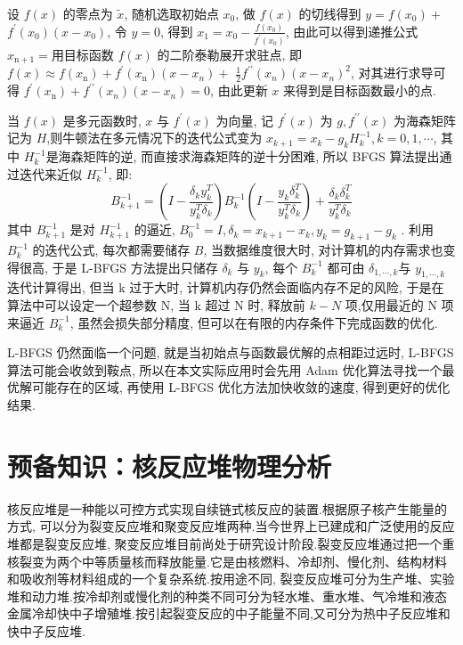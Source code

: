 \documentclass{Sichuan Normal University}
\begin{document}
设 $f(x)$ 的零点为 $\tilde{x}$, 随机选取初始点 $x_0$, 做 $f(x)$ 的切线得到 $y=f\left(x_0\right)+$ $f^{\prime}\left(x_0\right)\left(x-x_0\right)$, 令 $y=0$, 得到 $x_1=x_0-\frac{f\left(x_0\right)}{f^{\prime}\left(x_0\right)}$, 
由此可以得到递推公式 $x_{\mathrm{n}+1}=$用目标函数 $f(x)$ 的二阶泰勒展开求驻点, 即 $f(x) \approx f\left(x_{\mathrm{n}}\right)+f^{\prime}\left(x_{\mathrm{n}}\right)\left(x-x_n\right)+$ $\frac{1}{2} f^{\prime \prime}\left(x_n\right)\left(x-x_n\right)^2$, 
对其进行求导可得 $f^{\prime}\left(x_{\mathrm{n}}\right)+f^{\prime \prime}\left(x_n\right)\left(x-x_n\right)=0$, 由此更新 $x$ 来得到是目标函数最小的点.

当 $f(x)$ 是多元函数时, $x$ 与 $f^{\prime}(x)$ 为向量, 记 $f^{\prime}(x)$ 为 $g, f^{\prime \prime}(x)$ 为海森矩阵记为 $H$,则牛顿法在多元情况下的迭代公式变为 $x_{k+1}=x_k-g_k H_k^{-1}, k=0,1, \cdots$, 其中 $H_k^{-1}$是海森矩阵的逆, 
而直接求海森矩阵的逆十分困难, 所以 BFGS 算法提出通过迭代来近似 $H_k^{-1}$, 即:
\begin{equation}
    B_{k+1}^{-1}=\left(I-\frac{\delta_k y_k^T}{y_k^T \delta_k}\right) B_k^{-1}\left(I-\frac{y_k \delta_k^T}{y_k^T \delta_k}\right)+\frac{\delta_k \delta_k^T}{y_k^T \delta_k}
\label{eq:BFGS}
\end{equation}其中 $B_{k+1}^{-1}$ 是对 $H_{k+1}^{-1}$ 的逼近, $B_0^{-1}=I, \delta_k=x_{k+1}-x_k, y_k=g_{k+1}-g_k$ .
利用 $B_k^{-1}$ 的迭代公式, 每次都需要储存 $B$, 当数据维度很大时, 对计算机的内存需求也变得很高, 于是 L-BFGS 方法提出只储存 $\delta_k$ 与 $y_k$, 每个 $B_k^{-1}$ 都可由 $\delta_{1, \cdots, k}$与 $y_{1, \cdots, k}$ 迭代计算得出, 但当 $\mathrm{k}$ 过于大时, 计算机内存仍然会面临内存不足的风险, 于是在算法中可以设定一个超参数 $\mathrm{N}$, 当 $\mathrm{k}$ 超过 $\mathrm{N}$ 时, 释放前 $k-N$ 项,仅用最近的 $\mathrm{N}$ 项来逼近 $B_k^{-1}$, 虽然会损失部分精度, 但可以在有限的内存条件下完成函数的优化.

L-BFGS 仍然面临一个问题, 就是当初始点与函数最优解的点相距过远时, L-BFGS 算法可能会收敛到鞍点, 所以在本文实际应用时会先用 Adam 优化算法寻找一个最优解可能存在的区域, 再使用 L-BFGS 优化方法加快收敛的速度, 得到更好的优化结果.

\section{预备知识：核反应堆物理分析}

核反应堆是一种能以可控方式实现自续链式核反应的装置.根据原子核产生能量的方式, 可以分为裂变反应堆和聚变反应堆两种\cite{XieZhongShengHeFanYingDuiWuLiFenXi2020}.当今世界上已建成和广泛使用的反应堆都是裂变反应堆, 聚变反应堆目前尚处于研究设计阶段.裂变反应堆通过把一个重核裂变为两个中等质量核而释放能量.它是由核燃料、冷却剂、慢化剂、结构材料和吸收剂等材料组成的一个复杂系统.按用途不同, 裂变反应堆可分为生产堆、实验堆和动力堆.按冷却剂或慢化剂的种类不同可分为轻水堆、重水堆、气冷堆和液态金属冷却快中子增殖堆.按引起裂变反应的中子能量不同,又可分为热中子反应堆和快中子反应堆.
\end{document}
